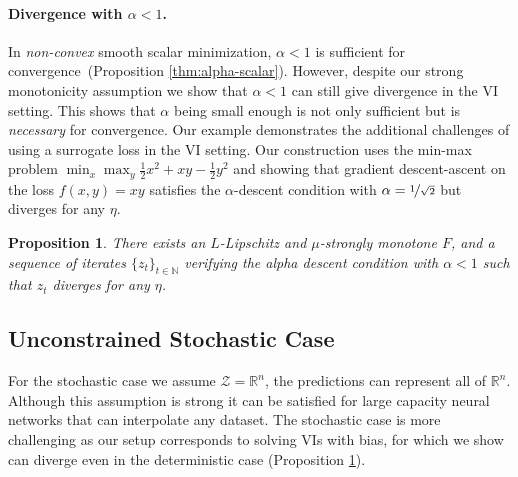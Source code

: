 \documentclass{article} %
\newtheorem{proposition}[theorem]{Proposition}
\theoremstyle{definition}
\newcommand{\reals}{\mathbb{R}}
\newcommand{\nnumbers}{\mathbb{N}}
\begin{document}
\paragraph{Divergence with $\alpha < 1$.}
In \emph{non-convex} smooth scalar minimization, $\alpha < 1$ is sufficient for convergence~(Proposition \ref{thm:alpha-scalar}). 
However, despite our strong monotonicity assumption we show that $\alpha < 1$ can still give divergence in the VI setting. 
This shows that $\alpha$ being small enough is not only sufficient but is \textit{necessary} for convergence.
Our example demonstrates the additional challenges of using a surrogate loss in the VI setting.
Our construction uses the min-max problem  $\min_x \max_y \frac{1}{2}x^2 + xy -\frac{1}{2}y^2$ and showing that gradient descent-ascent on the loss $f(x,y) = xy$ satisfies the $\alpha$-descent condition with $\alpha =\nicefrac{1}{\sqrt{2}}$ but diverges for any $\eta$.

\begin{proposition}\label{prop:counter}
There exists an $L$-Lipschitz and $\mu$-strongly monotone $F$, and a sequence of iterates $\{z_t\}_{t \in \nnumbers}$ verifying the alpha descent condition with  $\alpha < 1$  such that  $z_t$ diverges for any $\eta$.
\end{proposition}


\subsection{Unconstrained Stochastic Case}\label{sec:stochastic}
For the stochastic case we assume $\mathcal{Z}=\reals^n$, the predictions can represent all of $\reals^n$.
Although this assumption is strong it can be satisfied for large capacity neural networks that can interpolate any dataset. 
The stochastic case is more challenging as our setup corresponds to solving VIs with bias, for which we show can diverge even in the deterministic case (Proposition \ref{prop:counter}).
\end{document}
